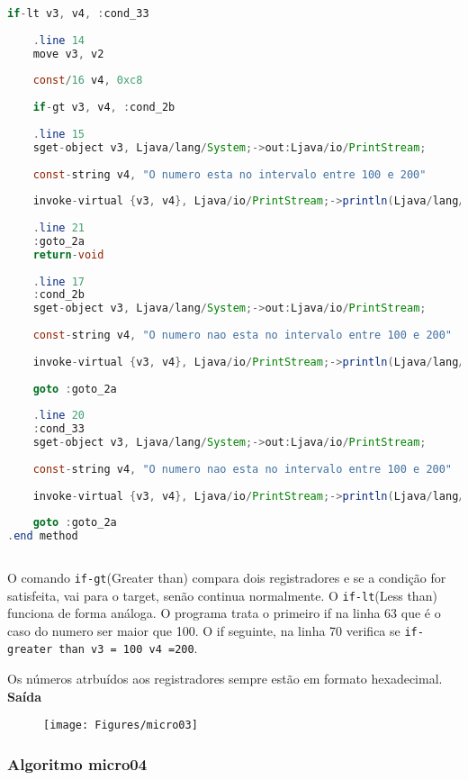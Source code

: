 \documentclass[hidelinks,12pt]{article}
\begin{document}
\begin{lstlisting}[caption=Smali resultante do .java,language=java]
	if-lt v3, v4, :cond_33
	
	.line 14
	move v3, v2
	
	const/16 v4, 0xc8
	
	if-gt v3, v4, :cond_2b
	
	.line 15
	sget-object v3, Ljava/lang/System;->out:Ljava/io/PrintStream;
	
	const-string v4, "O numero esta no intervalo entre 100 e 200"
	
	invoke-virtual {v3, v4}, Ljava/io/PrintStream;->println(Ljava/lang/String;)V
	
	.line 21
	:goto_2a
	return-void
	
	.line 17
	:cond_2b
	sget-object v3, Ljava/lang/System;->out:Ljava/io/PrintStream;
	
	const-string v4, "O numero nao esta no intervalo entre 100 e 200"
	
	invoke-virtual {v3, v4}, Ljava/io/PrintStream;->println(Ljava/lang/String;)V
	
	goto :goto_2a
	
	.line 20
	:cond_33
	sget-object v3, Ljava/lang/System;->out:Ljava/io/PrintStream;
	
	const-string v4, "O numero nao esta no intervalo entre 100 e 200"
	
	invoke-virtual {v3, v4}, Ljava/io/PrintStream;->println(Ljava/lang/String;)V
	
	goto :goto_2a
.end method	
	
	\end{lstlisting}
	
	O comando \texttt{if-gt}(Greater than) compara dois registradores e se a condição for satisfeita, vai para o target, senão continua normalmente. O \texttt{if-lt}(Less than) funciona de forma análoga. O programa trata o primeiro if na linha 63 que é o caso do numero ser maior que 100. O if seguinte, na linha 70 verifica se \texttt{if-greater than v3 = 100 v4 =200}.
	
	Os números atrbuídos aos registradores sempre estão em formato hexadecimal.\\
	
	{\large{\textbf{Saída}}}
	
	\begin{figure}[!h]
		\centering
		\texttt{[image: Figures/micro03]}
	\end{figure}
	
	\subsubsection{Algoritmo micro04}
	
\end{document}
